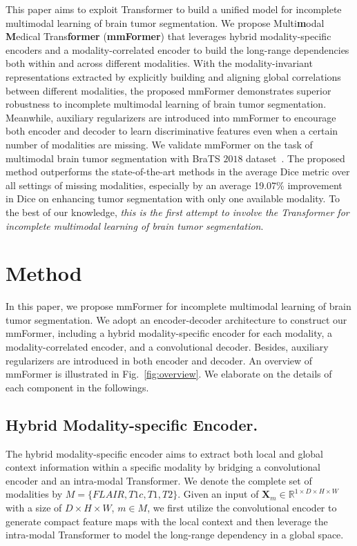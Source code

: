 \documentclass[runningheads]{llncs}
\begin{document}
This paper aims to exploit Transformer to build a unified model for incomplete multimodal learning of brain tumor segmentation. We propose Multi\textbf{m}odal \textbf{M}edical Trans\textbf{former} (\textbf{mmFormer}) that leverages hybrid modality-specific encoders and a modality-correlated encoder to build the long-range dependencies both within and across different modalities. With the modality-invariant representations extracted by explicitly building and aligning global correlations between different modalities, the proposed mmFormer demonstrates superior robustness to incomplete multimodal learning of brain tumor segmentation. Meanwhile, auxiliary regularizers are introduced into mmFormer to encourage both encoder and decoder to learn discriminative features even when a certain number of modalities are missing. We validate mmFormer on the task of multimodal brain tumor segmentation with BraTS $2018$ dataset~\cite{menze2014multimodal}. The proposed method outperforms the state-of-the-art methods in the average Dice metric over all settings of missing modalities, especially by an average 19.07\% improvement in Dice on enhancing tumor segmentation with only one available modality. To the best of our knowledge, \textit{this is the first attempt to involve the Transformer for incomplete multimodal learning of brain tumor segmentation}.

\section{Method}
\label{sec:method}

In this paper, we propose mmFormer for incomplete multimodal learning of brain tumor segmentation. We adopt an encoder-decoder architecture to construct our mmFormer, including a hybrid modality-specific encoder for each modality, a modality-correlated encoder, and a convolutional decoder. Besides, auxiliary regularizers are introduced in both encoder and decoder. An overview of mmFormer is illustrated in Fig.~\ref{fig:overview}. We elaborate on the details of each component in the followings.



\subsection{Hybrid Modality-specific Encoder.} 
The hybrid modality-specific encoder aims to extract both local and global context information within a specific modality by bridging a convolutional encoder and an intra-modal Transformer. We denote the complete set of modalities by $M=\{FLAIR, T1c, T1, T2\}$. Given an input of $\mathbf{X}_m \in \mathbb{R}^{1\times D\times H\times W}$ with a size of $D\times H\times W$, $m\in M$, we first utilize the convolutional encoder to generate compact feature maps with the local context and then leverage the intra-modal Transformer to model the long-range dependency in a global space.
\end{document}
